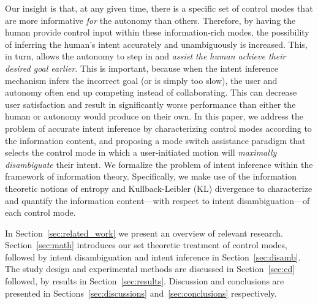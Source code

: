 \documentclass[conference]{IEEEtran}
\begin{document}
Our insight is that, at any given time, there is a specific set of control modes that are more informative \textit{for} the autonomy than others. Therefore, by having the human provide control input within these information-rich modes, the possibility of inferring the human's intent accurately and unambiguously is increased. This, in turn, allows the autonomy to step in and \textit{assist the human achieve their desired goal earlier}.  This is important, because when the intent inference mechanism infers the incorrect goal (or is simply too slow), the user and autonomy often end up competing instead of collaborating. This can decrease user satisfaction and result in significantly worse performance than either the human or autonomy would produce on their own. In this paper, we address the problem of accurate intent inference by characterizing control modes according to the information content, and proposing a mode switch assistance paradigm that selects the control mode in which a user-initiated motion will \textit{maximally disambiguate} their intent. We formalize the problem of intent inference within the framework of information theory. Specifically, we make use of the information theoretic notions of entropy and Kullback-Leibler (KL) divergence to characterize and quantify the information content---with respect to intent disambiguation---of each control mode.


In Section~\ref{sec:related_work} we present an overview of relevant research. Section~\ref{sec:math} introduces our set theoretic treatment of control modes, followed by intent disambiguation and intent inference in Section~\ref{sec:disamb}. The study design and experimental methods are discussed in Section~\ref{sec:ed} followed, by results in Section~\ref{sec:results}. Discussion and conclusions are presented in Sections~\ref{sec:discussions} and~\ref{sec:conclusions} respectively. 
\end{document}
